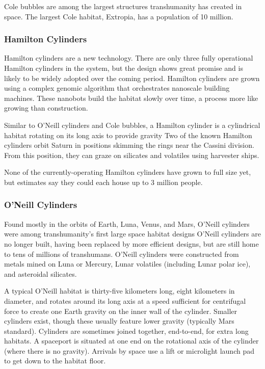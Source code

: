Cole bubbles are among the largest structures transhumanity has 
created in space. The largest Cole habitat, Extropia, has a population
of 10 million.

\subsubsection{Hamilton Cylinders}

Hamilton cylinders are a new technology. There are only three fully 
operational Hamilton cylinders in the system, but the design shows 
great promise and is likely to be widely adopted over the coming 
period. Hamilton cylinders are grown using a complex genomic 
algorithm that orchestrates nanoscale building machines. These 
nanobots build the habitat slowly over time, a process more like 
growing than construction.

Similar to O'Neill cylinders and Cole bubbles, a Hamilton cylinder
is a cylindrical habitat rotating on its long axis to provide gravity
Two of the known Hamilton cylinders orbit Saturn in positions
skimming the rings near the Cassini division. From this position, 
they can graze on silicates and volatiles using harvester ships.

None of the currently-operating Hamilton cylinders have grown 
to full size yet, but estimates say they could each house up to 3 
million people.

\subsubsection{O'Neill Cylinders}

Found mostly in the orbits of Earth, Luna, Venus, and Mars, O'Neill 
cylinders were among transhumanity's first large space habitat designs
O'Neill cylinders are no longer built, having been replaced
by more efficient designs, but are still home to tens of millions of 
transhumans. O'Neill cylinders were constructed from metals mined 
on Luna or Mercury, Lunar volatiles (including Lunar polar ice), 
and asteroidal silicates.

A typical O'Neill habitat is thirty-five kilometers long, eight kilometers
in diameter, and rotates around its long axis at a speed
sufficient for centrifugal force to create one Earth gravity on the 
inner wall of the cylinder. Smaller cylinders exist, though these 
usually feature lower gravity (typically Mars standard). Cylinders 
are sometimes joined together, end-to-end, for extra long habitats. 
A spaceport is situated at one end on the rotational axis of the 
cylinder (where there is no gravity). Arrivals by space use a lift or 
microlight launch pad to get down to the habitat floor.

